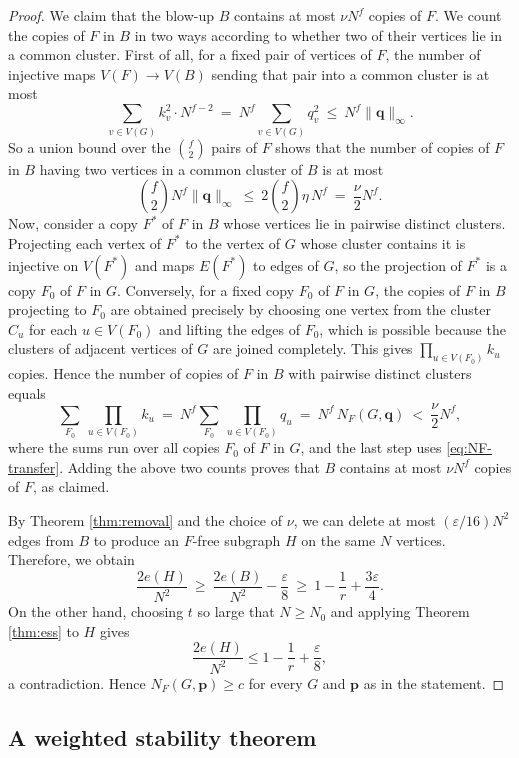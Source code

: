 \documentclass[11pt, a4paper]{article}
\theoremstyle{definition}
\theoremstyle{plain}
\renewcommand{\le}{\leqslant}
\renewcommand{\ge}{\geqslant}
\begin{document}
\begin{proof}
We claim that the blow-up $B$ contains at most $\nu N^f$ copies of $F$. 
We count the copies of $F$ in $B$ in two ways according to whether two of their vertices lie in a common cluster.
First of all, for a fixed pair of vertices of $F$, the number of injective maps
$V(F)\to V(B)$ sending that pair into a common cluster is at most
$$\sum_{v\in V(G)}k_v^2\cdot N^{f-2}\ = \ N^f\sum_{v\in V(G)} q_v^2 
\ \le \ N^f\lVert\bm q\rVert_\infty.$$
So a union bound over the ${f \choose 2}$ pairs of $F$ shows that the number of copies of $F$ in $B$ having two vertices in a common cluster of $B$ is at most 
\[
  \binom f2 N^f\lVert\bm q\rVert_\infty\ \le\ 2\binom f2\eta\, N^f
  \ =\ \frac{\nu}{2}N^f. 
\] 
Now, consider a copy $F^*$ of $F$ in $B$ whose vertices lie in pairwise distinct
clusters. Projecting each vertex of $F^*$ to the vertex of $G$ whose
cluster contains it is injective on $V(F^*)$ and maps $E(F^*)$ to
edges of $G$, so the projection of $F^*$ is a copy $F_0$ of $F$ in
$G$. Conversely, for a fixed copy $F_0$ of $F$ in $G$, the copies of
$F$ in $B$ projecting to $F_0$ are obtained precisely by choosing one
vertex from the cluster $C_u$ for each $u\in V(F_0)$ and lifting the
edges of $F_0$, which is possible because the clusters of adjacent
vertices of $G$ are joined completely. This gives
$\prod_{u\in V(F_0)}k_u$ copies. Hence the number of copies of $F$ in
$B$ with pairwise distinct clusters equals
\[
  \sum_{F_0}\ \prod_{u\in V(F_0)}k_u
  \ =\ N^f\sum_{F_0}\ \prod_{u\in V(F_0)}q_u
  \ =\ N^f\,N_F(G,\bm q)\ <\ \frac{\nu}{2}N^f,
\]
where the sums run over all copies $F_0$ of $F$ in $G$, and the last
step uses \eqref{eq:NF-transfer}. Adding the above two counts proves that $B$ contains at most $\nu N^f$ copies of $F$, as claimed. 


By Theorem \ref{thm:removal} and the choice of $\nu$, we can delete
at most $(\varepsilon/16)N^2$ edges from $B$ to produce an $F$-free subgraph
$H$ on the same $N$ vertices. 
Therefore, we obtain 
\[
  \frac{2e(H)}{N^2}\ \ge\ \frac{2e(B)}{N^2}-\frac{\varepsilon}{8}
  \ \ge\ 1-\frac1r+\frac{3\varepsilon}{4}.
\]
On the other hand, choosing $t$ so large that $N\ge N_0$ and applying
Theorem \ref{thm:ess} to $H$ gives
$$ \frac{2e(H)}{N^2} \le 1-\frac1r+\frac{\varepsilon}{8},$$
 a contradiction. Hence
$N_F(G,\bm p)\ge c$ for every $G$ and $\bm p$ as in the statement.
\end{proof}
 


\subsection{A weighted stability theorem}
\end{document}
